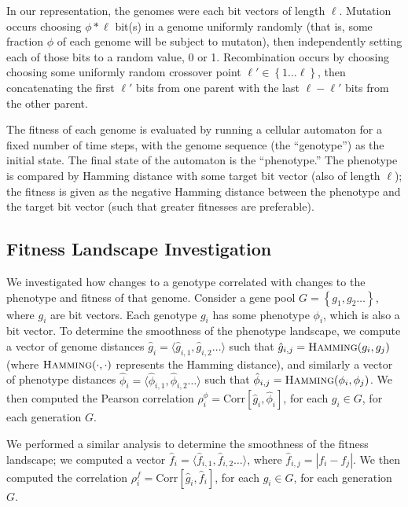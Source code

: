 \documentclass[twocolumn]{article}
\newcommand{\set}[1]{\left\{#1\right\}}
\newcommand{\seq}[1]{\langle #1 \rangle}
\newcommand{\hamming}[2]{\textsc{Hamming}(#1, #2)}
\newcommand{\corr}[2]{\text{Corr}\left[#1, #2\right]}
\begin{document}
In our representation, the genomes were each bit vectors of length $\ell$. Mutation occurs choosing $\phi*\ell$ bit(s) in a genome uniformly randomly (that is, some fraction $\phi$ of each genome will be subject to mutaton), then independently setting each of those bits to a random value, 0 or 1. Recombination occurs by choosing choosing some uniformly random crossover point $\ell' \in \set{1\ldots\ell}$, then concatenating the first $\ell'$ bits from one parent with the last $\ell-\ell'$ bits from the other parent.  

The fitness of each genome is evaluated by running a cellular automaton for a fixed number of time steps, with the genome sequence (the ``genotype'') as the initial state. The final state of the automaton is the ``phenotype.'' The phenotype is compared by Hamming distance with some target bit vector (also of length $\ell$); the fitness is given as the negative Hamming distance between the phenotype and the target bit vector (such that greater fitnesses are preferable). 

\subsection{Fitness Landscape Investigation}

We investigated how changes to a genotype correlated with changes to the phenotype and fitness of that genome. Consider a gene pool $G = \set{g_1, g_2 \ldots}$, where $g_i$ are bit vectors. Each genotype $g_i$ has some phenotype $\phi_i$, which is also a bit vector. To determine the smoothness of the phenotype landscape, we compute a vector of genome distances $\hat{g}_i = \seq{\hat{g}_{i,1}, \hat{g}_{i,2} \ldots}$ such that $\hat{g}_{i,j} = \hamming{g_i}{g_j}$ (where $\hamming{\cdot}{\cdot}$ represents the Hamming distance), and similarly a vector of phenotype distances $\hat{\phi}_i = \seq{\hat{\phi}_{i,1}, \hat{\phi}_{i,2} \ldots}$ such that $\hat{\phi}_{i,j} = \hamming{\phi_i}{\phi_j}$. We then computed the Pearson correlation $\rho_i^\phi = \corr{\hat{g}_i}{\hat{\phi}_i}$, for each $g_i \in G$, for each generation $G$.

We performed a similar analysis to determine the smoothness of the fitness landscape; we computed a vector $\hat{f}_i = \seq{\hat{f}_{i,1}, \hat{f}_{i,2} \ldots}$, where $\hat{f}_{i,j} = |f_i - f_j|$. We then computed the correlation $\rho_i^f = \corr{\hat{g}_i}{\hat{f}_i}$, for each $g_i \in G$, for each generation $G$. 
\end{document}
